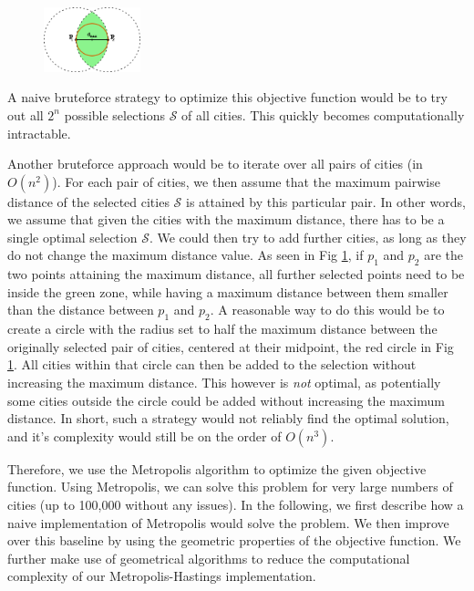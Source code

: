 \documentclass[conference,compsoc]{IEEEtran}
\newcommand{\selected}{\mathcal{S}} \newcommand{\newselected}{\hat{\mathcal{S}}}
\begin{document}
\begin{figure}
\vspace{-10pt}
\includegraphics[width=0.25\textwidth]{images/path899.png}
\vspace{-15pt}
\caption{}
\vspace{-15pt}
\label{fig:zones}
\end{figure}
A naive bruteforce strategy to optimize this objective function would be to try
out all $2^n$ possible selections $\selected$ of all cities. This quickly
becomes computationally intractable.



Another bruteforce approach would be to iterate over all pairs of cities (in
$O(n^2)$). For each pair of cities, we then assume that the maximum pairwise
distance of the selected cities $\selected$ is attained by this particular pair.
In other words, we assume that given the cities with the maximum distance, there
has to be a single optimal selection $\selected$. We could then try to add
further cities, as long as they do not change the maximum distance value. As
seen in Fig \ref{fig:zones}, if $p_1$ and $p_2$ are the two points attaining the
maximum distance, all further selected points need to be inside the green zone,
while having a maximum distance between them smaller than the distance between
$p_1$ and $p_2$. A reasonable way to do this would be to create a circle with
the radius set to half the maximum distance between the originally selected pair
of cities, centered at their midpoint, the red circle in Fig \ref{fig:zones}.
All cities within that circle can then be added to the selection without
increasing the maximum distance. This however is \emph{not} optimal, as
potentially some cities outside the circle could be added without increasing the
maximum distance. In short, such a strategy would not reliably find the optimal
solution, and it's complexity would still be on the order of $O(n^3)$.\

Therefore, we use the Metropolis algorithm \cite{metropolis53} to optimize the
given objective function. Using Metropolis, we can solve this problem for very
large numbers of cities (up to 100,000 without any issues). In the following, we
first describe how a naive implementation of Metropolis would solve the problem.
We then improve over this baseline by using the geometric properties of the
objective function. We further make use of geometrical algorithms to reduce the
computational complexity of our Metropolis-Hastings implementation.
\end{document}
